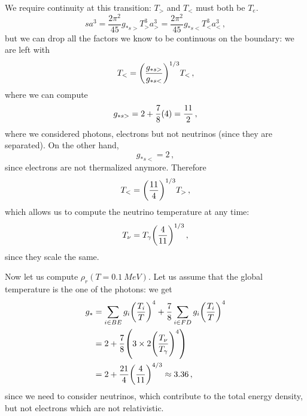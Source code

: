 \documentclass[main.tex]{subfiles}
\begin{document}
We require continuity at this transition: \(T_{>}\) and \(T_{<}\) must both be \(T_{e}\).  
%
\begin{equation}
  s a^3 = 
  \frac{2 \pi^2}{45} g_{*s>}T^{3}_{>} a^{3}_{>} = 
  \frac{2 \pi^2}{45} g_{*s<}T^{3}_{<} a^{3}_{<}
\,,
\end{equation}
%
but we can drop all the factors we know to be continuous on the boundary:
we are left with 
%
\begin{equation}
  T_{<} = \qty(\frac{g_{*s>}}{g_{*s<}})^{1/3} T_{<}
\,,
\end{equation}
%
where we can compute 
%
\begin{equation}
  g_{* s>} = 2 + \frac{7}{8}\qty(4) = \frac{11}{2}
\,,
\end{equation}
%
where we considered photons, electrons but not neutrinos (since they are separated). On the other hand, 
%
\begin{equation}
  g_{*s<} = 2
\,,
\end{equation}
%
since electrons are not thermalized anymore. Therefore 
%
\begin{equation}
  T_{<} = \qty(\frac{11}{4})^{1/3} T_{>}
\,,
\end{equation}
%
which allows us to compute the neutrino temperature at any time: 
%
\begin{equation}
  T_{\nu } = T_{\gamma } \qty(\frac{4}{11})^{1/3}
\,,
\end{equation}
%
since they scale the same.

Now let us compute \(\rho_{r} (T = \SI{0.1}{MeV})\).
Let us assume that the global temperature is the one of the photons: we get 
%
\begin{subequations}
\begin{align}
  g_{*} &=  \sum _{i \in BE} g_i \qty(\frac{T_i}{T})^{4} + 
  \frac{7}{8}\sum _{i \in FD} g_i \qty(\frac{T_i}{T})^{4}  \\
  &= 2 + \frac{7}{8} \qty(3 \times 2 \qty(\frac{T_{\nu }}{T_{\gamma }})^{4})  \\
  &= 2 + \frac{21}{4} \qty(\frac{4}{11})^{4/3} \approx 3.36
\,,
\end{align}
\end{subequations}
%
since we need to consider neutrinos, which contribute to the total energy density, but not electrons which are not relativistic.
\end{document}
